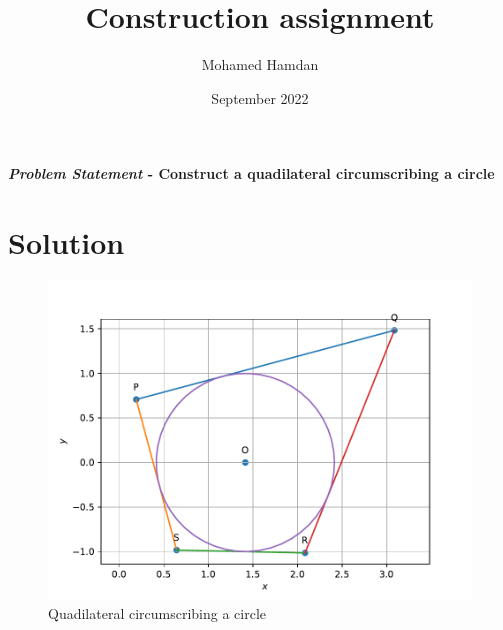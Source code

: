 \documentclass[journal,10pt,twocolumn]{article}
\title{\textbf{Construction assignment}}
\author{Mohamed Hamdan}
\date{September 2022}
\begin{document}
\maketitle
\paragraph{\textit{Problem Statement} - Construct a quadilateral circumscribing a circle}

\section*{\large Solution}

\begin{figure}[h]
\centering
\includegraphics[width=1\columnwidth]{figs/fig1.pdf}
\caption{Quadilateral circumscribing a circle}
\label{fig:circ_quad}
\end{figure}
\end{document}
